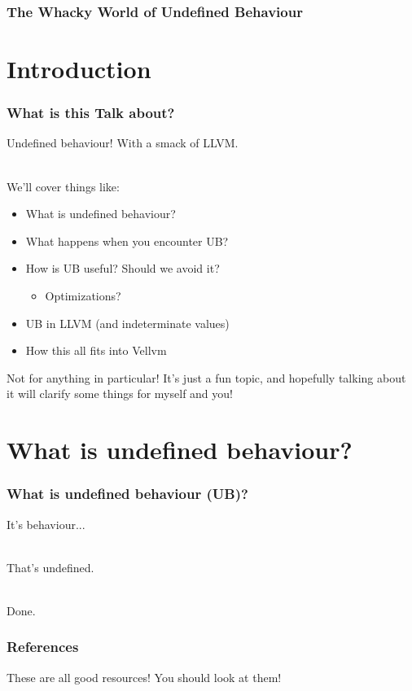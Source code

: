 \documentclass{beamer}
\author{
  Beck, Calvin\\
  \href{mailto:hobbes@seas.upenn.edu}{hobbes@seas.upenn.edu}
}
\begin{document}
\begin{frame}
  \frametitle{The Whacky World of Undefined Behaviour}
  \maketitle
\end{frame}

\section{Introduction}

\begin{frame}
  \frametitle{What is this Talk about?}

  Undefined behaviour! With a smack of LLVM.\\~\

  We'll cover things like:

  \begin{itemize}
  \item What is undefined behaviour?
  \item What happens when you encounter UB?
  \item How is UB useful? Should we avoid it?
    \begin{itemize}
    \item Optimizations?
    \end{itemize}
  \item UB in LLVM (and indeterminate values)
  \item How this all fits into Vellvm
  \end{itemize}
  \vspace{\baselineskip}
  Not for anything in particular! It's just a fun topic, and hopefully
  talking about it will clarify some things for myself and you!

\end{frame}

\section{What is undefined behaviour?}

\begin{frame}[fragile]
  \frametitle{What is undefined behaviour (UB)?}

  It's behaviour...\\~

  \pause

  That's undefined.\\~

  \pause

  \huge{Done.}

\end{frame}

\begin{frame}
  \frametitle{References}

  \nocite{*}
  \printbibliography

  These are all good resources! You should look at them!
\end{frame}
\end{document}
